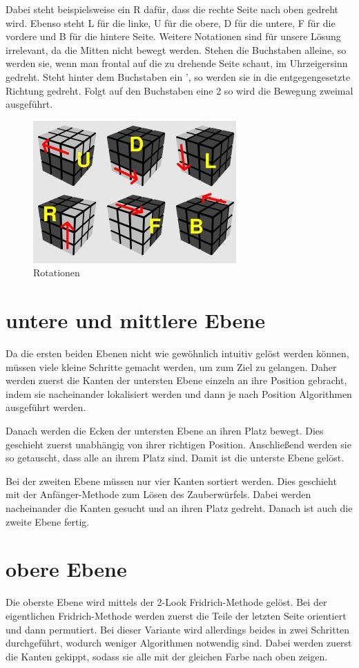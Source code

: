 \documentclass[a4paper,11pt]{scrreprt}
\renewcommand{\sec}[2]{
  \section{#1}\label{#2}
}
\begin{document}
      Dabei steht beispielsweise ein R dafür, dass die rechte Seite nach oben gedreht wird. Ebenso steht L für die linke, U für die obere, D für die untere, F für die vordere und B für die hintere Seite. Weitere Notationen sind für unsere Lösung irrelevant, da die Mitten nicht bewegt werden. Stehen die Buchstaben alleine, so werden sie, wenn man frontal auf die zu drehende Seite schaut, im Uhrzeigersinn gedreht. Steht hinter dem Buchstaben ein ', so werden sie in die entgegengesetzte Richtung gedreht. Folgt auf den Buchstaben eine 2 so wird die Bewegung zweimal ausgeführt.
      \begin{figure}[!h]
        \centering
        \includegraphics[width=0.5\columnwidth]{cubeRotations}
        \caption{Rotationen}
      \end{figure}

    \sec{untere und mittlere Ebene}{f2l}
      Da die ersten beiden Ebenen nicht wie gewöhnlich intuitiv gelöst werden können, müssen viele kleine Schritte gemacht werden, um zum Ziel zu gelangen.
      Daher werden zuerst die Kanten der untersten Ebene einzeln an ihre Position gebracht, indem sie nacheinander lokalisiert werden und dann je nach Position Algorithmen ausgeführt werden.

      Danach werden die Ecken der untersten Ebene an ihren Platz bewegt. Dies geschieht zuerst unabhängig von ihrer richtigen Position. Anschließend werden sie so getauscht, dass alle an ihrem Platz sind.
      Damit ist die unterste Ebene gelöst.

      Bei der zweiten Ebene müssen nur vier Kanten sortiert werden. Dies geschieht mit der Anfänger-Methode zum Lösen des Zauberwürfels. Dabei werden nacheinander die Kanten gesucht und an ihren Platz gedreht. Danach ist auch die zweite Ebene fertig.

    \sec{obere Ebene}{oben}
      Die oberste Ebene wird mittels der 2-Look Fridrich-Methode gelöst. Bei der eigentlichen Fridrich-Methode werden zuerst die Teile der letzten Seite orientiert und dann permutiert. Bei dieser Variante wird allerdings beides in zwei Schritten durchgeführt, wodurch weniger Algorithmen notwendig sind.
      Dabei werden zuerst die Kanten gekippt, sodass sie alle mit der gleichen Farbe nach oben zeigen.
\end{document}
